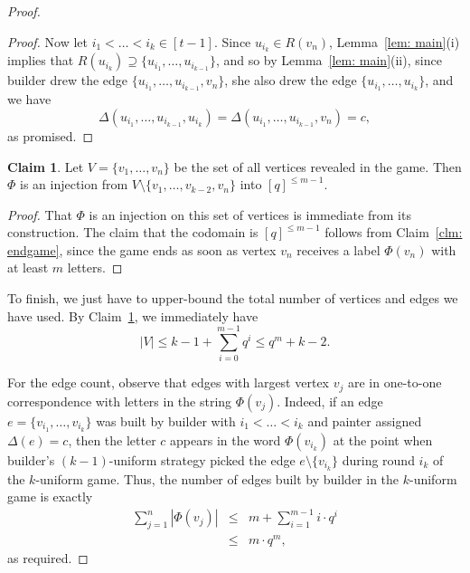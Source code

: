 \documentclass[A4paper,reqno,oneside,12pt]{amsart}
\theoremstyle{plain}
\theoremstyle{definition}
\newtheorem{claim}[theorem]{Claim}
\begin{document}
\begin{proof}
\begin{proof}
    Now let $i_1 < \dots < i_k \in [t-1]$.
    Since $u_{i_k} \in R(v_n)$, Lemma~\ref{lem: main}(i) implies that
    $R(u_{i_k}) \supseteq \{u_{i_1}, \dots, u_{i_{k-1}}\}$, and so by Lemma~\ref{lem: main}(ii), since builder drew the edge $\{u_{i_1}, \dots, u_{i_{k-1}}, v_n\}$, she also drew the edge $\{u_{i_1}, \dots, u_{i_k}\}$, and we have
    \begin{equation*}
        \Delta(u_{i_1}, \dots, u_{i_{k-1}}, u_{i_k}) = \Delta(u_{i_1}, \dots, u_{i_{k-1}}, v_n) = c,
    \end{equation*}
    as promised.
\end{proof}

\begin{claim}
\label{clm: injection}
    Let $V = \{v_1, \dots, v_n\}$ be the set of all vertices revealed in the game.
    Then $\Phi$ is an injection from $V \setminus \{v_1, \dots, v_{k-2}, v_n\}$ into $[q]^{\leq m-1}$.
\end{claim}

\begin{proof}
    That $\Phi$ is an injection on this set of vertices is immediate from its construction.
    The claim that the codomain is $[q]^{\leq m-1}$ follows from Claim~\ref{clm: endgame}, since the game ends as soon as vertex $v_n$ receives a label $\Phi(v_n)$ with at least $m$ letters.
\end{proof}

To finish, we just have to upper-bound the total number of vertices and edges we have used.
By Claim~\ref{clm: injection}, we immediately have
\begin{equation*}
    |V| \leq k-1+\sum_{i=0}^{m-1} q^i \leq q^m + k - 2.
\end{equation*}

For the edge count, observe that edges with largest vertex $v_j$ are in one-to-one correspondence with letters in the string $\Phi(v_j)$.
Indeed, if an edge $e = \{v_{i_1}, \dots, v_{i_k}\}$ was built by builder with $i_1 < \dots < i_k$ and painter assigned $\Delta(e) = c$, then the letter $c$ appears in the word $\Phi(v_{i_k})$ at the point when builder's $(k-1)$-uniform strategy picked the edge $e \setminus \{v_{i_k}\}$ during round $i_k$ of the $k$-uniform game.
Thus, the number of edges built by builder in the $k$-uniform game is exactly
\begin{eqnarray*}
    \sum_{j=1}^n |\Phi(v_j)|
    &\leq& m + \sum_{i=1}^{m-1} i \cdot q^i\\
    &\leq& m \cdot q^m,
\end{eqnarray*}
as required.
\end{proof}
\end{document}
